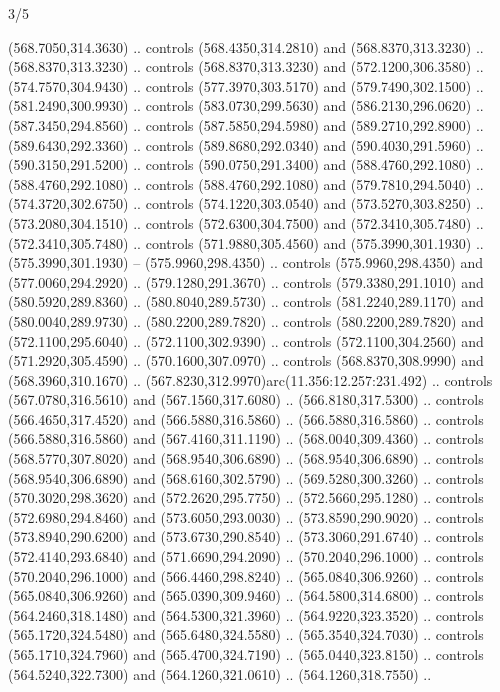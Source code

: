 \begin{flagdescription}{3/5}
\begin{scope}[xshift=0.5\flaglength,yshift=0.5\flagwidth,scale=\flagwidth/602.3]
\begin{scope}[y=0.8pt, x=0.8pt, yscale=-1, shift={(-600,-330)}]
  (568.7050,314.3630) .. controls (568.4350,314.2810) and (568.8370,313.3230) ..
  (568.8370,313.3230) .. controls (568.8370,313.3230) and (572.1200,306.3580) ..
  (574.7570,304.9430) .. controls (577.3970,303.5170) and (579.7490,302.1500) ..
  (581.2490,300.9930) .. controls (583.0730,299.5630) and (586.2130,296.0620) ..
  (587.3450,294.8560) .. controls (587.5850,294.5980) and (589.2710,292.8900) ..
  (589.6430,292.3360) .. controls (589.8680,292.0340) and (590.4030,291.5960) ..
  (590.3150,291.5200) .. controls (590.0750,291.3400) and (588.4760,292.1080) ..
  (588.4760,292.1080) .. controls (588.4760,292.1080) and (579.7810,294.5040) ..
  (574.3720,302.6750) .. controls (574.1220,303.0540) and (573.5270,303.8250) ..
  (573.2080,304.1510) .. controls (572.6300,304.7500) and (572.3410,305.7480) ..
  (572.3410,305.7480) .. controls (571.9880,305.4560) and (575.3990,301.1930) ..
  (575.3990,301.1930) -- (575.9960,298.4350) .. controls (575.9960,298.4350) and
  (577.0060,294.2920) .. (579.1280,291.3670) .. controls (579.3380,291.1010) and
  (580.5920,289.8360) .. (580.8040,289.5730) .. controls (581.2240,289.1170) and
  (580.0040,289.9730) .. (580.2200,289.7820) .. controls (580.2200,289.7820) and
  (572.1100,295.6040) .. (572.1100,302.9390) .. controls (572.1100,304.2560) and
  (571.2920,305.4590) .. (570.1600,307.0970) .. controls (568.8370,308.9990) and
  (568.3960,310.1670) .. (567.8230,312.9970)arc(11.356:12.257:231.492) ..
  controls (567.0780,316.5610) and (567.1560,317.6080) .. (566.8180,317.5300) ..
  controls (566.4650,317.4520) and (566.5880,316.5860) .. (566.5880,316.5860) ..
  controls (566.5880,316.5860) and (567.4160,311.1190) .. (568.0040,309.4360) ..
  controls (568.5770,307.8020) and (568.9540,306.6890) .. (568.9540,306.6890) ..
  controls (568.9540,306.6890) and (568.6160,302.5790) .. (569.5280,300.3260) ..
  controls (570.3020,298.3620) and (572.2620,295.7750) .. (572.5660,295.1280) ..
  controls (572.6980,294.8460) and (573.6050,293.0030) .. (573.8590,290.9020) ..
  controls (573.8940,290.6200) and (573.6730,290.8540) .. (573.3060,291.6740) ..
  controls (572.4140,293.6840) and (571.6690,294.2090) .. (570.2040,296.1000) ..
  controls (570.2040,296.1000) and (566.4460,298.8240) .. (565.0840,306.9260) ..
  controls (565.0840,306.9260) and (565.0390,309.9460) .. (564.5800,314.6800) ..
  controls (564.2460,318.1480) and (564.5300,321.3960) .. (564.9220,323.3520) ..
  controls (565.1720,324.5480) and (565.6480,324.5580) .. (565.3540,324.7030) ..
  controls (565.1710,324.7960) and (565.4700,324.7190) .. (565.0440,323.8150) ..
  controls (564.5240,322.7300) and (564.1260,321.0610) .. (564.1260,318.7550) ..

\end{scope}
\end{scope}
\end{flagdescription}
